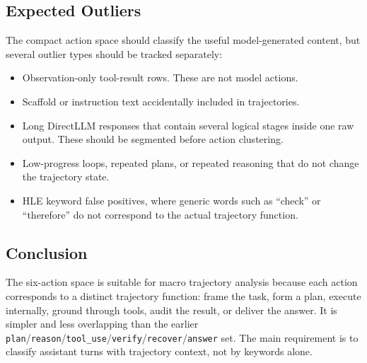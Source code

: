 \subsection{Expected Outliers}

The compact action space should classify the useful model-generated content, but
several outlier types should be tracked separately:

\begin{itemize}
\item Observation-only tool-result rows. These are not model actions.
\item Scaffold or instruction text accidentally included in trajectories.
\item Long DirectLLM responses that contain several logical stages inside one
raw output. These should be segmented before action clustering.
\item Low-progress loops, repeated plans, or repeated reasoning that do not
change the trajectory state.
\item HLE keyword false positives, where generic words such as ``check'' or
``therefore'' do not correspond to the actual trajectory function.
\end{itemize}

\subsection{Conclusion}

The six-action space is suitable for macro trajectory analysis because each
action corresponds to a distinct trajectory function: frame the task, form a
plan, execute internally, ground through tools, audit the result, or deliver the
answer. It is simpler and less overlapping than the earlier
\texttt{plan}/\texttt{reason}/\texttt{tool\_use}/\texttt{verify}/\texttt{recover}/\texttt{answer}
set. The main requirement is to classify assistant turns with trajectory context,
not by keywords alone.
